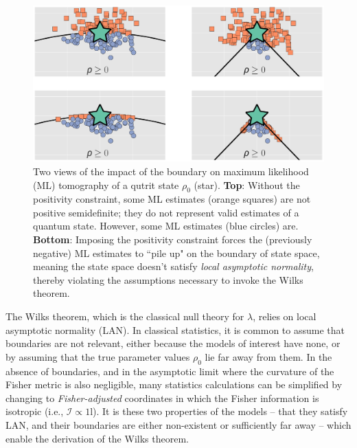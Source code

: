 \documentclass[aps,pra, twocolumn]{revtex4-1}
\newcommand{\Id}{\mathbb{I}}
\def\Id{1\!\mathrm{l}}
\begin{document}
\begin{figure}
\includegraphics[width=\columnwidth]{Images/Figure_1.pdf}
 \caption{Two views of the impact of the boundary on maximum likelihood (ML) tomography of a qutrit state $\rho_{0}$ (star). \textbf{Top}: Without the positivity constraint, some ML estimates (orange squares) are not positive semidefinite; they do not represent valid estimates of a quantum state. However, some ML estimates (blue circles) are.
\textbf{Bottom}:  Imposing the positivity constraint forces the (previously negative) ML estimates to ``pile up" on the boundary of state space, meaning the state space doesn't satisfy \emph{local asymptotic normality}, thereby violating the assumptions necessary to invoke the Wilks theorem.}
\label{fig:boundaries}
\end{figure}

The Wilks theorem, which is the classical null theory for $\lambda$, relies on local asymptotic normality (LAN). In classical statistics, it is common to assume that boundaries are not relevant, either because the models of interest have none, or by assuming that the true parameter values $\rho_{0}$ lie far away from them.  In the absence of boundaries, and in the asymptotic limit where the curvature of the Fisher metric is also negligible, many statistics calculations can be simplified by changing to \emph{Fisher-adjusted} coordinates in which the Fisher information is isotropic (i.e., $\mathcal{I}\propto\Id$). It is these two properties of the models  -- that they satisfy LAN, and their boundaries are either non-existent or sufficiently far away -- which enable the derivation of the Wilks theorem.
\end{document}
